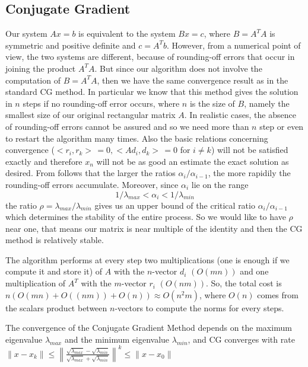 \documentclass{article}
\begin{document}
\subsection{Conjugate Gradient}\label{subsec:conjugate-gradient}
Our system $Ax = b$ is equivalent to the system $Bx = c$, where $B = A^{T}A$ is symmetric and positive definite and $c = A^{T}b$. However, from a numerical point of view, the two systems are different, because of rounding-off errors that occur in joining the product $A^{T}A$. But since our algorithm does not involve the computation of $B = A^{T}A$, then we have the same convergence result as in the standard CG method. In particular we know that this method gives the solution in $n$ steps if no rounding-off error occurs, where $n$ is the size of $B$, namely the smallest size of our original rectangular matrix $A$. In realistic cases, the absence of rounding-off errors cannot be assured and so we need more than $n$ step or even to restart the algorithm many times. Also the basic relations concerning convergence ($<r_i,r_k>\,= 0, <Ad_i,d_k>\,= 0$ for $i \ne k$) will not be satisfied exactly and therefore $x_n$ will not be as good an estimate the exact solution as desired. From \cite{hestenes1952methods} follows that the larger the ratios $\alpha_i / \alpha_{i-1}$, the more rapidily the rounding-off errors accumulate. Moreover, since $\alpha_i$ lie on the range
\[
1 / \lambda_{max} < \alpha_i < 1 / \lambda_{min}
\] 
the ratio $\rho = \lambda_{max}/\lambda_{min}$ gives us an upper bound of the critical ratio  $\alpha_i / \alpha_{i-1}$ which determines the stability of the entire process. So we would like to have $\rho$ near one, that means our matrix is near multiple of the identity and then the CG method is relatively stable. 

The algorithm performs at every step two multiplications  (one is enough if we compute it and store it) of $A$ with the $n$-vector $d_i$ $(O(mn))$ and one multiplication of $A^{T}$ with the $m$-vector $r_i$ $(O(nm))$. 
So, the total cost is $n(O(mn) + O((nm)) + O(n)) \approx O(n^2m)$, where $O(n)$ comes from the scalars product between $n$-vectors to compute the norms for every steps.

The convergence of the Conjugate Gradient Method depends on the maximum eigenvalue $\lambda_{max}$ and the minimum eigenvalue $\lambda_{min}$, and CG converges with rate 
\\$\|x-x_{k}\| \leq \left\lVert\frac{\sqrt{\lambda_{max}}-\sqrt{\lambda_{min}}}{\sqrt{\lambda_{max}}+\sqrt{\lambda_{min}}}\right\rVert^{k} \leq \|x - x_{0}\|$
\end{document}
